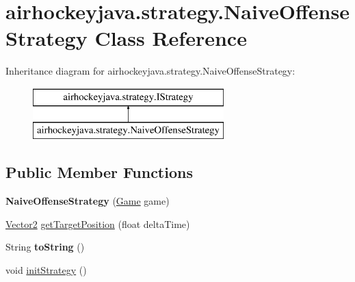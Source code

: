 \hypertarget{classairhockeyjava_1_1strategy_1_1_naive_offense_strategy}{}\section{airhockeyjava.\+strategy.\+Naive\+Offense\+Strategy Class Reference}
\label{classairhockeyjava_1_1strategy_1_1_naive_offense_strategy}
Inheritance diagram for airhockeyjava.\+strategy.\+Naive\+Offense\+Strategy\+:\begin{figure}[H]
\begin{center}
\leavevmode
\includegraphics[height=2.000000cm]{classairhockeyjava_1_1strategy_1_1_naive_offense_strategy}
\end{center}
\end{figure}
\subsection*{Public Member Functions}
\begin{DoxyCompactItemize}
\item 
\hypertarget{classairhockeyjava_1_1strategy_1_1_naive_offense_strategy_a3086682aa471b69dd3a0e06edd1cbde1}{}{\bfseries Naive\+Offense\+Strategy} (\hyperlink{classairhockeyjava_1_1game_1_1_game}{Game} game)\label{classairhockeyjava_1_1strategy_1_1_naive_offense_strategy_a3086682aa471b69dd3a0e06edd1cbde1}

\item 
\hyperlink{classairhockeyjava_1_1util_1_1_vector2}{Vector2} \hyperlink{classairhockeyjava_1_1strategy_1_1_naive_offense_strategy_abd97ea4c8c973821819b132ab61bcbbc}{get\+Target\+Position} (float delta\+Time)
\item 
\hypertarget{classairhockeyjava_1_1strategy_1_1_naive_offense_strategy_a8114c9d02e994e53d06a64fa5fd610d5}{}String {\bfseries to\+String} ()\label{classairhockeyjava_1_1strategy_1_1_naive_offense_strategy_a8114c9d02e994e53d06a64fa5fd610d5}

\item 
void \hyperlink{classairhockeyjava_1_1strategy_1_1_naive_offense_strategy_ace0bcde8dbe5254e0c866b52f857ba9a}{init\+Strategy} ()
\end{DoxyCompactItemize}


